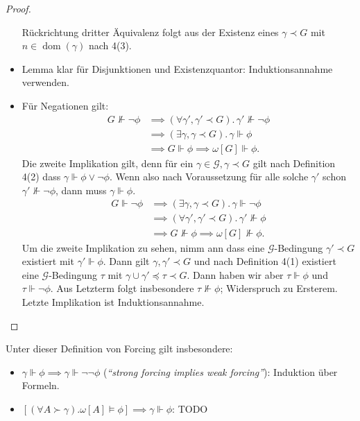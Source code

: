 \documentclass[nofonts]{uebung}
\DeclareMathOperator{\dom}{dom}
\begin{document}
\begin{proof}
\begin{itemize}
            Rückrichtung dritter Äquivalenz folgt aus der Existenz eines $\gamma\prec G$ mit $n\in\dom(\gamma)$ nach 4(3).
        \item Lemma klar für Disjunktionen und Existenzquantor: Induktionsannahme verwenden.
        \item Für Negationen gilt: 
            \begin{align*}
                G\not\Vdash \neg\phi &\implies (\forall \gamma', \gamma'\prec G).\,\gamma'\not\Vdash \neg\phi\\
                                     &\implies (\exists \gamma, \gamma\prec G).\,\gamma\Vdash \phi\\
                                     &\implies G\Vdash\phi \implies \omega[G]\Vdash \phi.
            \end{align*}
            Die zweite Implikation gilt, denn für ein $\gamma\in \mathcal G, \gamma\prec G$ gilt nach Definition 4(2) dass $\gamma\Vdash \phi\lor \neg \phi$.
            Wenn also nach Voraussetzung für alle solche $\gamma'$ schon $\gamma'\not\Vdash \neg\phi$, dann muss $\gamma\Vdash \phi$.
            \begin{align*}
                G\Vdash \neg\phi &\implies (\exists \gamma, \gamma\prec G).\,\gamma\Vdash \neg\phi\\
                                     &\implies (\forall \gamma', \gamma'\prec G).\,\gamma'\not\Vdash \phi\\
                                     &\implies G\not\Vdash\phi \implies \omega[G]\not\Vdash \phi.
            \end{align*}
            Um die zweite Implikation zu sehen, nimm ann dass eine $\mathcal G$-Bedingung $\gamma'\prec G$ existiert mit $\gamma'\Vdash\phi$.
            Dann gilt $\gamma, \gamma'\prec G$ und nach Definition 4(1) existiert eine $\mathcal G$-Bedingung $\tau$ mit $\gamma\cup\gamma'\preceq\tau\prec G$.
            Dann haben wir aber $\tau\Vdash \phi$ und $\tau\Vdash\neg\phi$. Aus Letzterm folgt insbesondere $\tau\not\Vdash\phi$; Widerspruch zu Ersterem. Letzte Implikation ist Induktionsannahme. \qedhere
    \end{itemize}
\end{proof}
Unter dieser Definition von Forcing gilt insbesondere:
\begin{itemize}
    \item $\gamma\Vdash\phi\implies\gamma\Vdash\neg\neg\phi$ (\emph{“strong forcing implies weak forcing”}): Induktion über Formeln.
    \item $[(\forall A\succ \gamma).\omega[A]\vDash\phi]\implies \gamma\Vdash\phi$: TODO
\end{itemize}
\end{document}
